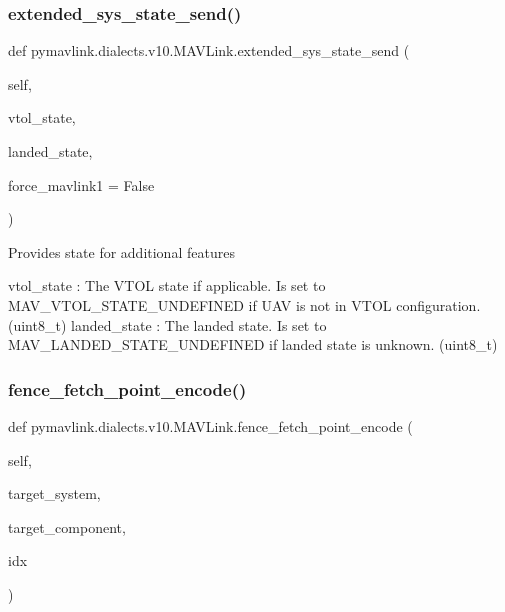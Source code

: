 \begin{DoxyVerb}
\begin{DoxyVerb}
\subsubsection{\texorpdfstring{extended\+\_\+sys\+\_\+state\+\_\+send()}{extended\_sys\_state\_send()}}
{\footnotesize\ttfamily def pymavlink.\+dialects.\+v10.\+M\+A\+V\+Link.\+extended\+\_\+sys\+\_\+state\+\_\+send (\begin{DoxyParamCaption}\item[{}]{self,  }\item[{}]{vtol\+\_\+state,  }\item[{}]{landed\+\_\+state,  }\item[{}]{force\+\_\+mavlink1 = {\ttfamily False} }\end{DoxyParamCaption})}

\begin{DoxyVerb}Provides state for additional features

vtol_state                : The VTOL state if applicable. Is set to MAV_VTOL_STATE_UNDEFINED if UAV is not in VTOL configuration. (uint8_t)
landed_state              : The landed state. Is set to MAV_LANDED_STATE_UNDEFINED if landed state is unknown. (uint8_t)\end{DoxyVerb}
 \mbox{\label{classpymavlink_1_1dialects_1_1v10_1_1MAVLink_a1d4ca04da6d59c2e2ca27d58cbb98db5}} 
\subsubsection{\texorpdfstring{fence\+\_\+fetch\+\_\+point\+\_\+encode()}{fence\_fetch\_point\_encode()}}
{\footnotesize\ttfamily def pymavlink.\+dialects.\+v10.\+M\+A\+V\+Link.\+fence\+\_\+fetch\+\_\+point\+\_\+encode (\begin{DoxyParamCaption}\item[{}]{self,  }\item[{}]{target\+\_\+system,  }\item[{}]{target\+\_\+component,  }\item[{}]{idx }\end{DoxyParamCaption})}


\end{DoxyVerb}
\end{DoxyVerb}
